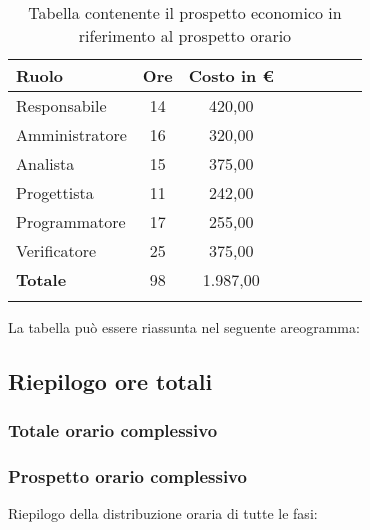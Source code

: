 			\begin{longtable}{|l|c|c|c|c|c|c|c|}
				\hline
				\rowcolor{lighter-grayer}
				\textbf{Ruolo} & \textbf{Ore} & \textbf{Costo in €} \\
				\hline
				\endfirsthead
				
				\hline
				Responsabile & 14 & 420,00\\
				\hline
				\hline
				Amministratore & 16 & 320,00\\
				\hline
				\hline
				Analista & 15 & 375,00\\
				\hline
				\hline
				Progettista & 11 & 242,00\\
				\hline
				\hline
				Programmatore & 17 & 255,00\\
				\hline
				\hline
				Verificatore & 25 & 375,00\\
				\hline
				\textbf{Totale} & 98 & 1.987,00\\
				\hline
				\caption{Tabella contenente il prospetto economico in riferimento al prospetto orario}
			\end{longtable}
			\pagebreak
		
			La tabella può essere riassunta nel seguente areogramma:
			
			\subsection{Riepilogo ore totali}
			\subsubsection{Totale orario complessivo}
			\subsubsection{Prospetto orario complessivo}
			Riepilogo della distribuzione oraria di tutte le fasi:
			
